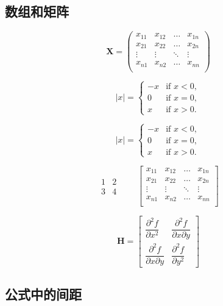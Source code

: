 \documentclass[12pt,UTF8]{ctexart}%
\begin{document}
\subsection{数组和矩阵}

\[ \mathbf{X} = \left(
\begin{array}{cccc}
x_{11} & x_{12} & \ldots & x_{1n}\\
x_{21} & x_{22} & \ldots & x_{2n}\\
\vdots & \vdots & \ddots & \vdots\\
x_{n1} & x_{n2} & \ldots & x_{nn}\\
\end{array} \right) \]

\[ |x| = \left\{
\begin{array}{rl}
-x & \text{if } x < 0,\\
0 & \text{if } x = 0,\\
x & \text{if } x > 0.
\end{array} \right. \]

\[ |x| =
\begin{cases}
-x & \text{if } x < 0,\\
0 & \text{if } x = 0,\\
x & \text{if } x > 0.
\end{cases} \]

\[
\begin{matrix}
1 & 2 \\ 3 & 4
\end{matrix} \qquad
\begin{bmatrix}
x_{11} & x_{12} & \ldots & x_{1n}\\
x_{21} & x_{22} & \ldots & x_{2n}\\
\vdots & \vdots & \ddots & \vdots\\
x_{n1} & x_{n2} & \ldots & x_{nn}\\
\end{bmatrix}
\]


\[
\mathbf{H}=
\begin{bmatrix}
\dfrac{\partial^2 f}{\partial x^2} &
\dfrac{\partial^2 f}
{\partial x \partial y} \\[8pt]
\dfrac{\partial^2 f}
{\partial x \partial y} &
\dfrac{\partial^2 f}{\partial y^2}
\end{bmatrix}
\]



\subsection{公式中的间距}
\end{document}
